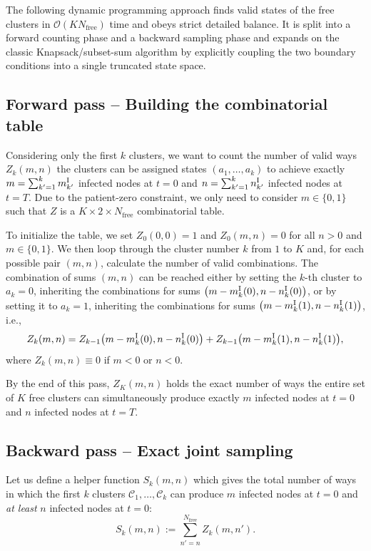 \documentclass[english,10pt,aps,pra,twocolumn,superscriptaddress,floatfix,fleqn]{revtex4-2}
\newcommand{\mc}[1]{\mathcal{#1}}
\newcommand{\C} {\mc{C}}
\renewcommand{\O} {\mc{O}}
\newcommand{\tI}{\textnormal{I}}
\begin{document}
The following dynamic programming approach finds valid states of the free clusters in $\O(KN_\text{free})$ time and obeys strict detailed balance. It is split into a forward counting phase and a backward sampling phase and expands on the classic Knapsack/subset-sum algorithm \cite{Martello1990,Kellerer2004} by explicitly coupling the two boundary conditions into a single truncated state space.

\subsection{Forward pass -- Building the combinatorial table}
Considering only the first $k$ clusters, we want to count the number of valid ways $Z_k(m,n)$ the clusters can be assigned states $(a_1,\dotsc,a_k)$ to achieve exactly $m=\sum_{k'=1}^{k} m^\tI_{k'}$ infected nodes at $t=0$ and $n=\sum_{k'=1}^{k} n^\tI_{k'}$ infected nodes at $t=T$. Due to the patient-zero constraint, we only need to consider $m\in\{0,1\}$ such that $Z$ is a $K\times 2\times N_\text{free}$ combinatorial table.

To initialize the table, we set $Z_0(0,0)=1$ and $Z_0(m,n)=0$ for all $n>0$ and $m\in\{0,1\}$. We then loop through the cluster number $k$ from $1$ to $K$ and, for each possible pair $(m,n)$, calculate the number of valid combinations. The combination of sums $(m,n)$ can be reached either by setting the $k$-th cluster to $a_k=0$, inheriting the combinations for sums $\big(m-m^\tI_k(0), n-n^\tI_k(0)\big)$, or by setting it to $a_k=1$, inheriting the combinations for sums $\big(m-m^\tI_k(1), n-n^\tI_k(1)\big)$, i.e.,
\begin{equation}
	Z_k(m,n) = Z_{k-1}\big(m-m^\tI_k(0), n-n^\tI_k(0)\big) + Z_{k-1}\big(m-m^\tI_k(1), n-n^\tI_k(1)\big),
\end{equation}
where $Z_k(m,n)\equiv 0$ if $m<0$ or $n<0$.

By the end of this pass, $Z_K(m,n)$ holds the exact number of ways the entire set of $K$ free clusters can simultaneously produce exactly $m$ infected nodes at $t=0$ and $n$ infected nodes at $t=T$.

\subsection{Backward pass -- Exact joint sampling}
Let us define a helper function $S_k(m,n)$ which gives the total number of ways in which the first $k$ clusters $\C_1,\dotsc,\C_k$ can produce $m$ infected nodes at $t=0$ and \emph{at least} $n$ infected nodes at $t=0$:
\begin{equation}
	S_k(m,n) := \sum_{n'=n}^{N_{\text{free}}} Z_k(m,n').
\end{equation}
\end{document}
